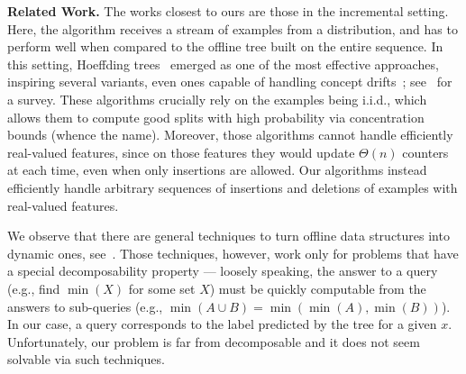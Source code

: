\noindent\textbf{Related Work.} 
The works closest to ours are those in the incremental setting. Here, the algorithm receives a stream of examples from a distribution, and has to perform well when compared to the offline tree built on the entire sequence. In this setting, Hoeffding trees~\cite{Domingos2000_HighSpeedStreams} emerged as one of the most effective approaches, inspiring several variants, even ones capable of handling concept drifts~\cite{Domingos2001_MiningTimeSeries,Gama2003_HighSpeedStreams,Manapragada2018_EFDT,Das2019_LearnSmartWithLess,sun2020_SpeedingUpVeryFast,Haug2022_DynamicModelTree,Jin2003_EfficientDecisionTree,Rutkowski2013_DecisionTreesForMining}; see~\cite{Manapragada2022_AnEagerSplitting} for a survey. These algorithms crucially rely on the examples being i.i.d., which allows them to compute good splits with high probability via concentration bounds (whence the name). Moreover, those algorithms cannot handle efficiently real-valued features, since on those features they would update $\Theta(n)$ counters at each time, even when only insertions are allowed. Our algorithms instead efficiently handle arbitrary sequences of insertions and deletions of examples with real-valued features. 

We observe that there are general techniques to turn offline data structures into dynamic ones, see~\cite{bentley1980_DecomposableSearchingProblems}. Those techniques, however, work only for problems that have a special decomposability property --- loosely speaking, the answer to a query (e.g., find $\min(X)$ for some set $X$) must be quickly computable from the answers to sub-queries (e.g., $\min(A \cup B) = \min(\min(A),\min(B))$). In our case, a query corresponds to the label predicted by the tree for a given $x$. Unfortunately, our problem is far from decomposable and it does not seem solvable via such techniques.


